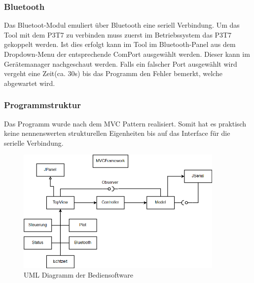 \subsubsection*{Bluetooth}

Das Bluetoot-Modul emuliert über Bluetooth eine seriell Verbindung. Um das Tool mit dem P3T7 zu verbinden muss zuerst im Betriebssystem das P3T7 gekoppelt werden.  Ist dies erfolgt kann im Tool im Bluetooth-Panel aus dem Dropdown-Menu der entsprechende ComPort ausgewählt werden. Dieser kann im Gerätemanager nachgeschaut werden. Falls ein falscher Port ausgewählt wird vergeht eine Zeit(ca. 30s) bis das Programm den Fehler bemerkt, welche abgewartet wird.


\subsubsection*{Programmstruktur}

Das Programm wurde nach dem MVC Pattern realisiert. Somit hat es praktisch keine nennenswerten strukturellen Eigenheiten bis auf das Interface für die serielle Verbindung. 

\begin{figure}[H]
\begin{center}
\includegraphics[width=0.9\textwidth]{images/Software_UML.png}
\caption{UML Diagramm der Bediensoftware}
\end{center}
\end{figure}

